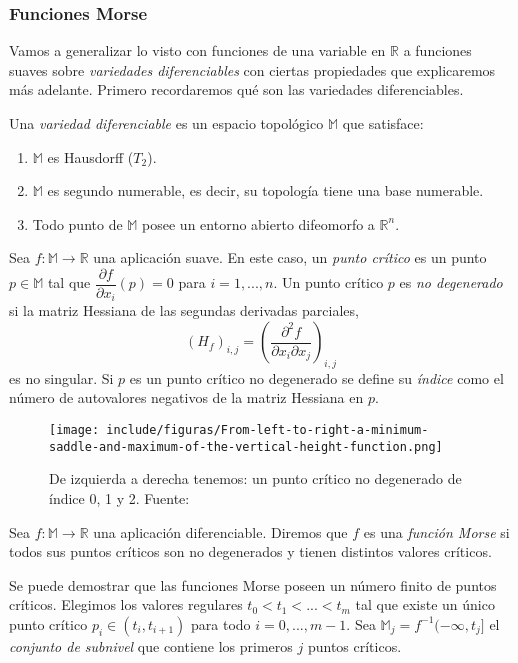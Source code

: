\subsubsection*{Funciones Morse} 
Vamos a generalizar lo visto con funciones de una variable en $\mathbb{R}$ a funciones suaves sobre \emph{variedades diferenciables} con ciertas propiedades que explicaremos más adelante. Primero recordaremos qué son las variedades diferenciables.

\begin{definition}
Una \emph{variedad diferenciable} es un espacio topológico $\mathbb{M}$ que satisface:
\begin{enumerate}
	\item $\mathbb{M}$ es Hausdorff ($T_2$).
	\item $\mathbb{M}$ es segundo numerable, es decir, su topología tiene una base numerable.
	\item Todo punto de $\mathbb{M}$ posee un entorno abierto difeomorfo a $\mathbb{R}^n$.
\end{enumerate}
\end{definition}

Sea $f: \mathbb{M} \to \mathbb{R}$ una aplicación suave. En este caso, un \emph{punto crítico} es un punto $p \in \mathbb{M}$ tal que $\dfrac{\partial f}{\partial x_i}(p)=0$ para $i = 1, ..., n$. Un punto crítico $p$ es \emph{no degenerado} si la matriz Hessiana de las segundas derivadas parciales,
\[
(H_f)_{i,j}=\left(\dfrac{\partial^2 f}{\partial x_i \partial x_j}\right)_{i,j}
\]
es no singular. Si $p$ es un punto crítico no degenerado se define su \emph{índice} como el número de autovalores negativos de la matriz Hessiana en $p$.

\begin{figure}[!ht]
\centering
\texttt{[image: include/figuras/From-left-to-right-a-minimum-saddle-and-maximum-of-the-vertical-height-function.png]} 
\caption{De izquierda a derecha tenemos: un punto crítico no degenerado de índice 0, 1 y 2. Fuente: \cite{articuloPersistenciaEH}}
\label{ref:morseCriticos}
\end{figure}

\begin{definition}
Sea $f: \mathbb{M} \to \mathbb{R}$ una aplicación diferenciable. Diremos que $f$ es una \emph{función Morse} si todos sus puntos críticos son no degenerados y tienen distintos valores críticos.
\end{definition}

\begin{sloppypar}
Se puede demostrar que las funciones Morse poseen un número finito de puntos críticos. Elegimos los valores regulares $t_0 < t_1 < ... < t_m$ tal que existe un único punto crítico ${p_i \in (t_i, t_{i+1})}$ para todo $i = 0, ..., m-1$. Sea $\mathbb{M}_j=f^{-1}(-\infty, t_j]$ el \emph{conjunto de subnivel} que contiene los primeros $j$ puntos críticos.
\end{sloppypar}

